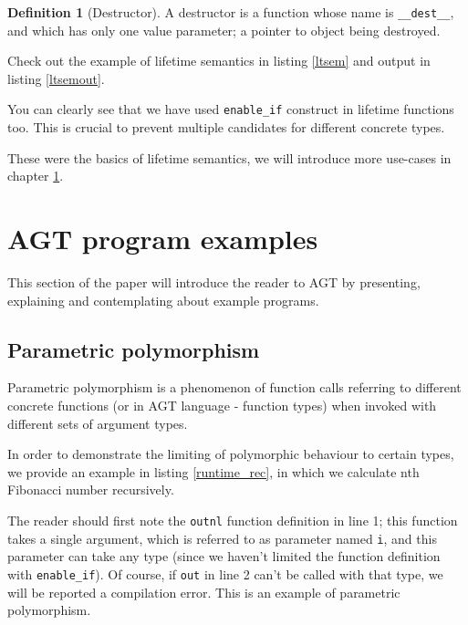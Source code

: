 \documentclass[times, utf8, diplomski]{fer}
\theoremstyle{definition}
\newtheorem{definition}{Definition}[]
\newcommand{\textcode}[3]{
    
}
\begin{document}
\begin{definition}[Destructor]
A destructor is a function whose name is \texttt{\_\_dest\_\_}, and which has only one value parameter;
a pointer to object being destroyed.
\end{definition}

Check out the example of lifetime semantics in listing \ref{ltsem} and output in listing \ref{ltsemout}.

\textcode{\resdir/compiler/lifetime_ex.agt}{ltsem}{Lifetime semantics}
\textcode{\resdir/compiler/lifetime_ex.out}{ltsemout}{Lifetime semantics - output}

You can clearly see that we have used \texttt{enable\_if} construct in lifetime functions too.
This is crucial to prevent multiple candidates for different concrete types.

These were the basics of lifetime semantics, we will introduce more use-cases
in chapter \ref{chap:examples}.




\chapter{AGT program examples}\label{chap:examples}

This section of the paper will introduce the reader to AGT by presenting, explaining and contemplating
about example programs.

\section{Parametric polymorphism}

Parametric polymorphism is a phenomenon of function calls referring to different concrete functions 
(or in AGT language - function types) when invoked with different sets of argument types.

In order to demonstrate the limiting of polymorphic behaviour to certain types, we provide
an example in listing \ref{runtime_rec}, in which we calculate nth Fibonacci number recursively.

\textcode{\resdir/programs/fib_runtime_recursion.agt}{runtime_rec}
{Fibonacci with recursion, Parametric Polymorphism}

The reader should first note the \texttt{outnl} function definition in line 1;
this function takes a single argument, which is referred to as parameter named \texttt{i},
and this parameter can take any type (since we haven't limited the function definition 
with \texttt{enable\_if}).
Of course, if \texttt{out} in line 2 can't be called with that type, we will be
reported a compilation error. This is an example of parametric polymorphism.
\end{document}

